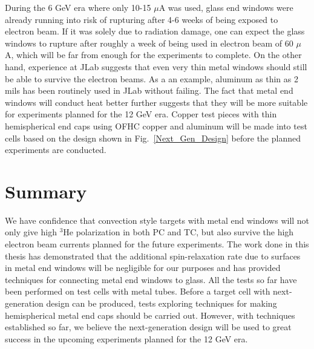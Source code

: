 During the 6 GeV era where only 10-15 $\mu$A was used, glass end windows were already running into risk of rupturing after 4-6 weeks of being exposed to electron beam. If it was solely due to radiation damage, one can expect the glass windows to rupture after roughly a week of being used in electron beam of 60 $\mu$A, which will be far from enough for the experiments to complete. On the other hand, experience at JLab suggests that even very thin metal windows should still be able to survive the electron beams. As a an example, aluminum as thin as 2 mils has been routinely used in JLab without failing. The fact that metal end windows will conduct heat better further suggests that they will be more suitable for experiments planned for the 12 GeV era. Copper test pieces with thin hemispherical end caps using OFHC copper and aluminum will be made into test cells based on the design shown in Fig.~\ref{Next_Gen_Design} before the planned experiments are conducted. 

\section{Summary}

We have confidence that convection style targets with metal end windows will not only give high $^3$He polarization in both PC and TC, but also survive the high electron beam currents planned for the future experiments. The work done in this thesis has demonstrated that the additional spin-relaxation rate due to surfaces in metal end windows will be negligible for our purposes and has provided techniques for connecting metal end windows to glass. All the tests so far have been performed on test cells with metal tubes. Before a target cell with next-generation design can be produced, tests exploring techniques for making hemispherical metal end caps should be carried out. However, with techniques established so far, we believe the next-generation design will be used to great success in the upcoming experiments planned for the 12 GeV era.
